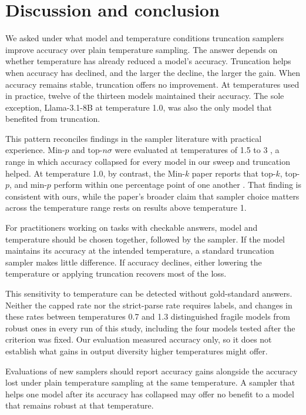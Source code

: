 \documentclass[10pt]{article}
\begin{document}
\section{Discussion and conclusion}
\label{sec:discussion}

We asked under what model and temperature conditions truncation samplers improve accuracy over
plain temperature sampling. The answer depends on whether temperature has already reduced a
model's accuracy. Truncation helps when accuracy has declined, and the larger the decline, the
larger the gain. When accuracy remains stable, truncation offers no improvement. At
temperatures used in practice, twelve of the thirteen models maintained their accuracy. The
sole exception, Llama-3.1-8B at temperature 1.0, was also the only model that benefited from
truncation.

This pattern reconciles findings in the sampler literature with practical experience. Min-$p$
and top-$n\sigma$ were evaluated at temperatures of 1.5 to 3
\citep{nguyen2024minp,tang2024topn}, a range in which accuracy collapsed for every model in our
sweep and truncation helped. At temperature 1.0, by contrast, the Min-$k$ paper reports that
top-$k$, top-$p$, and min-$p$ perform within one percentage point of one another
\citep{ding2026mink}. That finding is consistent with ours, while the paper's broader claim
that sampler choice matters across the temperature range rests on results above temperature 1.

For practitioners working on tasks with checkable answers, model and temperature should be
chosen together, followed by the sampler. If the model maintains its accuracy at the intended
temperature, a standard truncation sampler makes little difference. If accuracy declines,
either lowering the temperature or applying truncation recovers most of the loss.

This sensitivity to temperature can be detected without gold-standard answers. Neither the
capped rate nor the strict-parse rate requires labels, and changes in these rates between
temperatures 0.7 and 1.3 distinguished fragile models from robust ones in every run of this
study, including the four models tested after the criterion was fixed. Our evaluation measured
accuracy only, so it does not establish what gains in output diversity higher temperatures
might offer.

Evaluations of new samplers should report accuracy gains alongside the accuracy lost under
plain temperature sampling at the same temperature. A sampler that helps one model after its
accuracy has collapsed may offer no benefit to a model that remains robust at that temperature.
\end{document}
